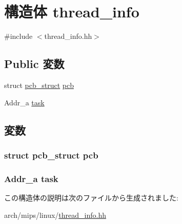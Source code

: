 \hypertarget{structLinux_1_1thread__info}{
\section{構造体 thread\_\-info}
\label{structLinux_1_1thread__info}
}


{\ttfamily \#include $<$thread\_\-info.hh$>$}\subsection*{Public 変数}
\begin{DoxyCompactItemize}
\item 
struct \hyperlink{structLinux_1_1pcb__struct}{pcb\_\-struct} \hyperlink{structLinux_1_1thread__info_a6da90870ac137315f69875a6fba3abd7}{pcb}
\item 
Addr\_\-a \hyperlink{structLinux_1_1thread__info_a9a084cb08c1c5557b7258b576e299526}{task}
\end{DoxyCompactItemize}


\subsection{変数}
\hypertarget{structLinux_1_1thread__info_a6da90870ac137315f69875a6fba3abd7}{
\subsubsection[{pcb}]{\setlength{\rightskip}{0pt plus 5cm}struct {\bf pcb\_\-struct} pcb}}
\label{structLinux_1_1thread__info_a6da90870ac137315f69875a6fba3abd7}
\hypertarget{structLinux_1_1thread__info_a9a084cb08c1c5557b7258b576e299526}{
\subsubsection[{task}]{\setlength{\rightskip}{0pt plus 5cm}Addr\_\-a task}}
\label{structLinux_1_1thread__info_a9a084cb08c1c5557b7258b576e299526}


この構造体の説明は次のファイルから生成されました:\begin{DoxyCompactItemize}
\item 
arch/mips/linux/\hyperlink{thread__info_8hh}{thread\_\-info.hh}\end{DoxyCompactItemize}
